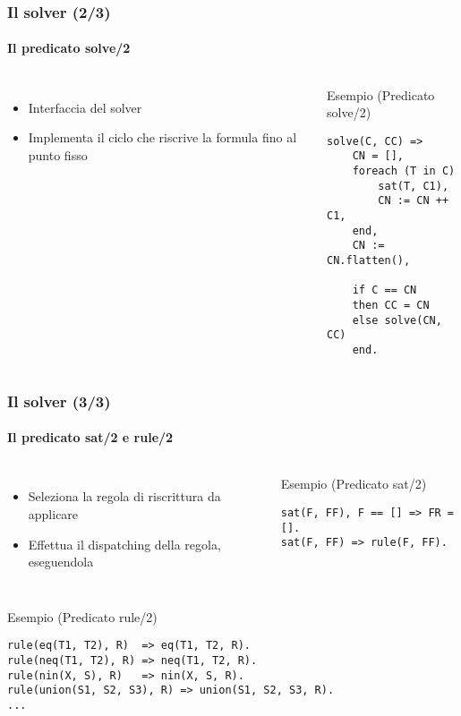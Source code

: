 \documentclass{beamer}
\begin{document}

\begin{frame}[fragile]
  \frametitle{Il solver (2/3)}
  \framesubtitle{Il predicato solve/2}
  
  \begin{columns}[c]
	\begin{itemize}
		\item Interfaccia del solver
		\item Implementa il ciclo che riscrive la formula fino al punto fisso
	\end{itemize}

    \begin{exampleblock}{Esempio (Predicato solve/2)}
\begin{verbatim}
solve(C, CC) =>
    CN = [],
    foreach (T in C)
        sat(T, C1),
        CN := CN ++ C1,
    end,
    CN := CN.flatten(),
    
    if C == CN
    then CC = CN
    else solve(CN, CC)
    end.
\end{verbatim}
    \end{exampleblock}	
  \end{columns}
\end{frame}


\begin{frame}[fragile]
  \frametitle{Il solver (3/3)}
  \framesubtitle{Il predicato sat/2 e rule/2}	
  
  \begin{columns}[c]
  
    \begin{itemize}
      \item Seleziona la regola di riscrittura da applicare
      \item Effettua il dispatching della regola, eseguendola
    \end{itemize}

    \begin{exampleblock}{Esempio (Predicato sat/2)}
\begin{verbatim}
sat(F, FF), F == [] => FR = [].
sat(F, FF) => rule(F, FF).
\end{verbatim}
    \end{exampleblock}	

  \end{columns}

  \begin{exampleblock}{Esempio (Predicato rule/2)}
\begin{verbatim}
rule(eq(T1, T2), R)  => eq(T1, T2, R).
rule(neq(T1, T2), R) => neq(T1, T2, R).
rule(nin(X, S), R)   => nin(X, S, R).
rule(union(S1, S2, S3), R) => union(S1, S2, S3, R).
...
\end{verbatim}
  \end{exampleblock}

\end{frame}
\end{document}
